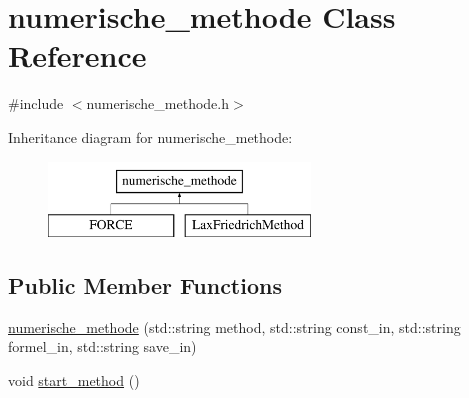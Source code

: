 \hypertarget{classnumerische__methode}{\section{numerische\-\_\-methode Class Reference}
\label{classnumerische__methode}
}


{\ttfamily \#include $<$numerische\-\_\-methode.\-h$>$}

Inheritance diagram for numerische\-\_\-methode\-:\begin{figure}[H]
\begin{center}
\leavevmode
\includegraphics[height=2.000000cm]{classnumerische__methode}
\end{center}
\end{figure}
\subsection*{Public Member Functions}
\begin{DoxyCompactItemize}
\item 
\hyperlink{classnumerische__methode_ae3d1f1d622e07a1ef02aeb6e3ee07811}{numerische\-\_\-methode} (std\-::string method, std\-::string const\-\_\-in, std\-::string formel\-\_\-in, std\-::string save\-\_\-in)
\item 
void \hyperlink{classnumerische__methode_a83d6b8c73e8afc831003b8abc334e185}{start\-\_\-method} ()
\end{DoxyCompactItemize}
